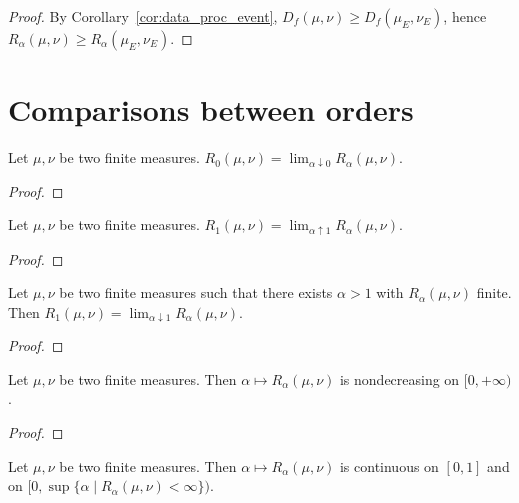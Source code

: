 \begin{proof}
By Corollary~\ref{cor:data_proc_event}, $D_f(\mu, \nu) \ge D_f(\mu_E, \nu_E)$, hence $R_\alpha(\mu, \nu) \ge R_\alpha(\mu_E, \nu_E)$.
\end{proof}

\section{Comparisons between orders}

\begin{lemma}
  \label{lem:renyi_tendsto_renyi_zero}
  Let $\mu, \nu$ be two finite measures. $R_0(\mu, \nu) = \lim_{\alpha \downarrow 0} R_\alpha(\mu, \nu)$.
\end{lemma}

\begin{proof}
\end{proof}

\begin{lemma}
  \label{lem:renyi_tendsto_renyi_one}
  Let $\mu, \nu$ be two finite measures. $R_1(\mu, \nu) = \lim_{\alpha \uparrow 1} R_\alpha(\mu, \nu)$.
\end{lemma}

\begin{proof}
\end{proof}

\begin{lemma}
  \label{lem:renyi_tendsto_renyi_one_above}
  Let $\mu, \nu$ be two finite measures such that there exists $\alpha > 1$ with $R_\alpha(\mu, \nu)$ finite. Then $R_1(\mu, \nu) = \lim_{\alpha \downarrow 1} R_\alpha(\mu, \nu)$.
\end{lemma}

\begin{proof}
\end{proof}

\begin{lemma}
  \label{lem:renyi_monotone}
  Let $\mu, \nu$ be two finite measures. Then $\alpha \mapsto R_\alpha(\mu, \nu)$ is nondecreasing on $[0, + \infty)$.
\end{lemma}

\begin{proof}
\end{proof}

\begin{lemma}
  \label{lem:renyi_continuous}
  Let $\mu, \nu$ be two finite measures. Then $\alpha \mapsto R_\alpha(\mu, \nu)$ is continuous on $[0, 1]$ and on $[0, \sup \{\alpha \mid R_\alpha(\mu, \nu) < \infty\})$.
\end{lemma}

